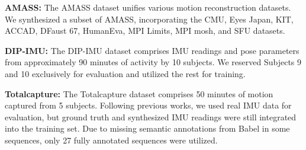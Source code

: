 \documentclass[letterpaper]{article} %
\begin{document}
\textbf{AMASS:} The AMASS dataset unifies various motion reconstruction datasets. We synthesized a subset of AMASS, incorporating the CMU, Eyes Japan, KIT, ACCAD, DFaust 67, HumanEva, MPI Limits, MPI mosh, and SFU datasets.

\textbf{DIP-IMU:} The DIP-IMU dataset comprises IMU readings and pose parameters from approximately 90 minutes of activity by 10 subjects. We reserved Subjects 9 and 10 exclusively for evaluation and utilized the rest for training.

\textbf{Totalcapture:} The Totalcapture dataset \cite{trumble2017total} 
comprises 50 minutes of motion captured from 5 subjects. Following previous works, we used real IMU data for evaluation, but ground truth and synthesized IMU readings were still integrated into the training set. Due to missing semantic annotations from Babel in some sequences, only 27 fully annotated sequences were utilized.
\end{document}
